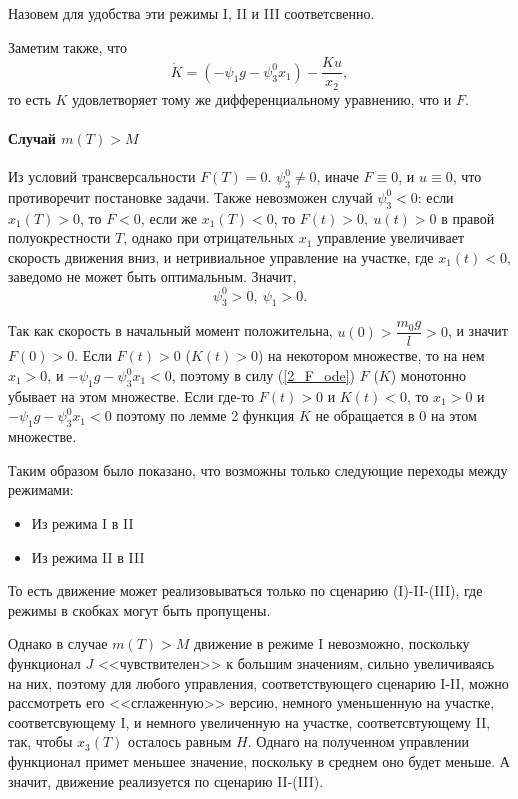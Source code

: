 \documentclass[16pt]{article}
\begin{document}
Назовем для удобства эти режимы I, II и III соответсвенно.

Заметим также, что 
$$\dot{K} = (-\psi_1g - \psi_3^0 x_1) - \dfrac{Ku}{x_2},$$
то есть $K$ удовлетворяет тому же дифференциальному уравнению, что и $F$.

\paragraph{Случай $m(T) > M$}
Из условий трансверсальности $F(T) = 0$. $\psi_3^0 \not= 0$, иначе $F \equiv 0$, и $u \equiv 0$, что противоречит
постановке задачи. Также невозможен случай $\psi_3^0 < 0$: если $x_1(T) > 0$, то $F < 0$, если же $x_1(T) < 0$, то
$F(t) > 0,\ u(t) > 0$ в правой полуокрестности $T$, однако при отрицательных $x_1$ управление увеличивает скорость
движения вниз, и нетривиальное управление на участке, где $x_1(t) < 0$, заведомо не может быть оптимальным.
Значит, $$\psi_3^0 > 0, \ \psi_1 > 0.$$

Так как скорость в начальный момент положительна, $u(0) > \dfrac{m_0g}{l} > 0$, и значит $F(0) > 0$.
Если $F(t) > 0$ ($K(t) > 0$) на некотором множестве, то на нем $x_1 > 0$, и $-\psi_1g-\psi_3^0x_1 < 0$,
поэтому в силу (\ref{2_F_ode}) $F$ ($K$) монотонно убывает на этом множестве. Если где-то $F(t) > 0$ и $K(t) < 0$,
то $x_1 > 0$ и $-\psi_1g-\psi_3^0x_1 < 0$ поэтому по лемме 2 функция $K$ не обращается в 0 на этом множестве.

Таким образом было показано, что возможны только следующие переходы между режимами: 
\begin{itemize}
\item
Из режима I в II
\item
Из режима II в III
\end{itemize}

То есть движение может реализовываться только по сценарию (I)-II-(III), где режимы в скобках могут быть пропущены.

Однако в случае $m(T) > M$ движение в режиме I невозможно, поскольку функционал $J$ <<чувствителен>>  к большим
значениям, сильно увеличиваясь на них, поэтому для любого управления, соответствующего сценарию I-II, можно
рассмотреть его <<сглаженную>> версию, немного уменьшенную на участке, соответсвующему I, и немного увеличенную на
участке, соответсвтующему II, так, чтобы $x_3(T)$ осталось равным $H$. Однаго на полученном управлении функционал
примет меньшее значение, поскольку в среднем оно будет меньше. А значит, движение реализуется по сценарию II-(III).
\end{document}
